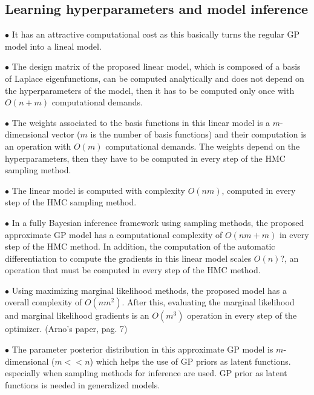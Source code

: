 \documentclass[]{interact}
\theoremstyle{plain}%
\theoremstyle{definition}
\theoremstyle{remark}
\begin{document}
\subsection{Learning hyperparameters and model inference}

\vspace{2mm}
$\bullet$ It has an attractive computational cost as this basically turns the regular GP model into a lineal model.

\vspace{2mm}
$\bullet$ The design matrix of the proposed linear model, which is composed of a basis of Laplace eigenfunctions, can be computed analytically and does not depend on the hyperparameters of the model, then it has to be computed only once with $O(n+m)$ computational demands.

\vspace{2mm}
$\bullet$ The weights associated to the basis functions in this linear model is a $m$-dimensional vector ($m$ is the number of basis functions) and their computation is an operation with $O(m)$ computational demands. The weights depend on the hyperparameters, then they have to be computed in every step of the HMC sampling method.

\vspace{2mm}
$\bullet$ The linear model is computed with complexity $O(nm)$, computed in every step of the HMC sampling method.

\vspace{2mm}
$\bullet$ In a fully Bayesian inference framework using sampling methods, the proposed approximate GP model has a computational complexity of $O(nm+m)$ in every step of the HMC method. In addition, the computation of the automatic differentiation to compute the gradients in this linear model scales $O(n)$?, an operation that must be computed in every step of the HMC method.

\vspace{2mm}
$\bullet$ Using maximizing marginal likelihood methods, the proposed model has a overall complexity of $O(nm^2)$. After this, evaluating the marginal likelihood and marginal likelihood gradients is an $O(m^3)$ operation in every step of the optimizer. (Arno's paper, pag. 7)

\vspace{2mm}
$\bullet$ The parameter posterior distribution in this approximate GP model is $m$-dimensional ($m<<n$) which helps the use of GP priors as latent functions. especially when sampling methods for inference are used. GP prior as latent functions is needed in generalized models.
\end{document}
